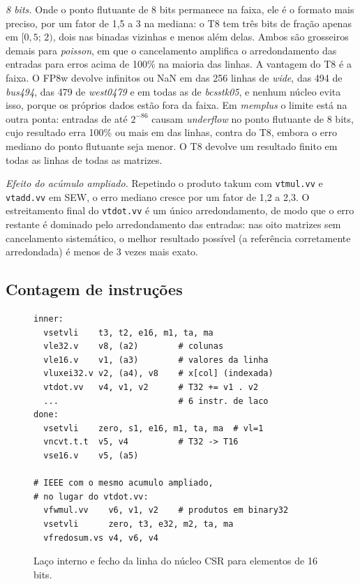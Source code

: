 \documentclass[conference]{IEEEtran}
\newcommand{\code}[1]{\texttt{#1}}
\begin{document}
\emph{8 bits.} Onde o ponto flutuante de 8 bits permanece na faixa, ele é o formato mais preciso, por um
fator de 1,5 a 3 na mediana: o T8 tem três bits de fração apenas em $[0{,}5;\,2)$, dois nas binadas
vizinhas e menos além delas. Ambos são grosseiros demais para \emph{poisson}, em que o cancelamento
amplifica o arredondamento das entradas para erros acima de 100\% na maioria das linhas. A vantagem do T8
é a faixa. O FP8w devolve infinitos ou NaN em \FPEIGHTBAD{} das 256 linhas de \emph{wide}, \NFBUS{} das
494 de \emph{bus494}, \NFWEST{} das 479 de \emph{west0479} e em todas as \NFBCS{} de \emph{bcsstk05}, e
nenhum núcleo evita isso, porque os próprios dados estão fora da faixa. Em \emph{memplus} o limite está na
outra ponta: entradas de até $2^{-86}$ causam \emph{underflow} no ponto flutuante de 8 bits, cujo resultado
erra 100\% ou mais em \MEMFEBAD{} das \MEMROWS{} linhas, contra \MEMTEBAD{} do T8, embora o erro mediano
do ponto flutuante seja menor. O T8 devolve um resultado finito em todas as linhas de todas as matrizes.

\emph{Efeito do acúmulo ampliado.} Repetindo o produto takum com \code{vtmul.vv} e \code{vtadd.vv} em SEW,
o erro mediano cresce por um fator de 1,2 a 2,3. O estreitamento final do \code{vtdot.vv} é um único
arredondamento, de modo que o erro restante é dominado pelo arredondamento das entradas: nas oito matrizes
sem cancelamento sistemático, o melhor resultado possível (a referência corretamente arredondada) é menos
de 3 vezes mais exato.

\subsection{Contagem de instruções}

\begin{figure}[t]
\footnotesize
\begin{verbatim}
inner:
  vsetvli    t3, t2, e16, m1, ta, ma
  vle32.v    v8, (a2)        # colunas
  vle16.v    v1, (a3)        # valores da linha
  vluxei32.v v2, (a4), v8    # x[col] (indexada)
  vtdot.vv   v4, v1, v2      # T32 += v1 . v2
  ...                        # 6 instr. de laco
done:
  vsetvli    zero, s1, e16, m1, ta, ma  # vl=1
  vncvt.t.t  v5, v4          # T32 -> T16
  vse16.v    v5, (a5)

# IEEE com o mesmo acumulo ampliado,
# no lugar do vtdot.vv:
  vfwmul.vv    v6, v1, v2    # produtos em binary32
  vsetvli      zero, t3, e32, m2, ta, ma
  vfredosum.vs v4, v6, v4
\end{verbatim}
\caption{Laço interno e fecho da linha do núcleo CSR para elementos de 16 bits.}
\label{fig:asm}
\end{figure}
\end{document}
